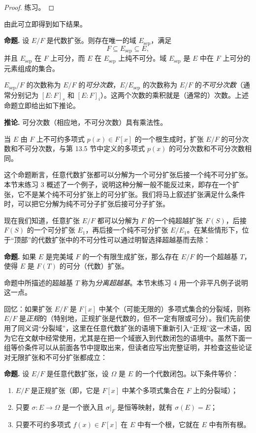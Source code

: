 \begin{proof}
练习。
\end{proof}

由此可立即得到如下结果。

\noindent\textbf{命题.} 设 $E/F$ 是代数扩张。则存在唯一的域 $E_{\mathrm{sep}}$，满足
\[
F\subseteq E_{\mathrm{sep}}\subseteq E,
\]
并且 $E_{\mathrm{sep}}$ 在 $F$ 上可分，而 $E$ 在 $E_{\mathrm{sep}}$ 上纯不可分。域 $E_{\mathrm{sep}}$ 是 $E$ 中在 $F$ 上可分的元素组成的集合。

$E_{\mathrm{sep}}/F$ 的次数称为 $E/F$ 的\emph{可分次数}，$E/E_{\mathrm{sep}}$ 的次数称为 $E/F$ 的\emph{不可分次数}（通常分别记为 $[E:F]_s$ 和 $[E:F]_i$）。这两个次数的乘积就是（通常的）次数。上述命题立即给出如下推论。

\noindent\textbf{推论.} 可分次数（相应地，不可分次数）具有乘法性。

当 $E$ 由 $F$ 上不可约多项式 $p(x)\in F[x]$ 的一个根生成时，扩张 $E/F$ 的可分次数和不可分次数，与第 13.5 节中定义的多项式 $p(x)$ 的可分次数和不可分次数相同。

这个命题断言，任意代数扩张都可以分解为一个可分扩张后接一个纯不可分扩张。本节末练习 3 概述了一个例子，说明这种分解一般不能反过来，即存在一个扩张，它不是某个纯不可分扩张上的可分扩张。我们将马上叙述扩张满足什么条件时，可以把它分解为纯不可分子扩张后接可分子扩张。

现在我们知道，任意扩张 $E/F$ 都可以分解为 $F$ 的一个纯超越扩张 $F(S)$，后接 $F(S)$ 的一个可分扩张 $E_1$，再后接一个纯不可分扩张 $E/E_1$。在某些情形下，位于“顶部”的代数扩张中的不可分性可以通过明智选择超越基而去除：

\noindent\textbf{命题.} 如果 $E$ 是完美域 $F$ 的一个有限生成扩张，那么存在 $E/F$ 的一个超越基 $T$，使得 $E$ 是 $F(T)$ 的可分（代数）扩张。

命题中所描述的超越基 $T$ 称为\emph{分离超越基}。本节末练习 4 用一个非平凡例子说明这一点。

回忆：如果扩张 $E/F$ 是 $F[x]$ 中某个（可能无限的）多项式集合的分裂域，则称 $E/F$ 是\emph{正规}的（特别地，正规扩张是代数的，但不一定有限或可分）。我们先前使用了同义词“分裂域”，这里在任意代数扩张的语境下重新引入“正规”这一术语，因为它在文献中经常使用，尤其是在把一个域嵌入到代数闭包的语境中。虽然下面一组等价条件可以从前面各节中提取出来，但读者应写出完整证明，并检查这些论证对无限扩张和不可分扩张都成立：

\noindent\textbf{命题.} 设 $E/F$ 是任意代数扩张，设 $\Omega$ 是 $E$ 的一个代数闭包。以下条件等价：
\begin{enumerate}[label=(\arabic*)]
\item $E/F$ 是正规扩张（即，它是 $F[x]$ 中某个多项式集合在 $F$ 上的分裂域）；
\item 只要 $\sigma:E\to \Omega$ 是一个嵌入且 $\sigma|_F$ 是恒等映射，就有 $\sigma(E)=E$；
\item 只要不可约多项式 $f(x)\in F[x]$ 在 $E$ 中有一个根，它就在 $E$ 中有所有根。
\end{enumerate}

